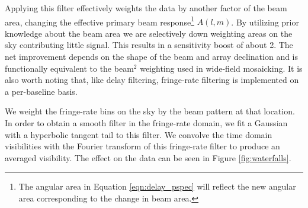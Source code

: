 \documentclass[twocolumn,numberedappendix]{emulateapj} \shorttitle{New Limits on the 21 cm Power Spectrum at $z=8.4$}
\begin{document}
Applying this filter effectively weights the data by another factor of the beam
area, changing the effective primary beam response\footnote{The
angular area in Equation \eqref{eqn:delay_pspec} will reflect the new angular area
corresponding to the change in beam area.} $A(l,m)$\citep{parsons_et_al2015}. By
utilizing prior knowledge about the beam area we are selectively down weighting
areas on the sky contributing little signal. This results in a sensitivity boost of
about 2.  The net improvement depends on the shape of the beam and array
declination and is functionally equivalent to the beam$^2$ weighting used in
wide-field mosaicking. It is also worth noting that, like delay 
filtering, fringe-rate filtering is implemented on a per-baseline basis.

 We weight
the fringe-rate bins on the sky by the beam pattern at that location.
In order to obtain a smooth filter in the fringe-rate domain, we fit a
Gaussian with a hyperbolic tangent tail to this filter. We convolve the time
domain visibilities with the Fourier transform of this fringe-rate filter to
produce an averaged visibility.  The effect on the data can be seen
in Figure \ref{fig:waterfalls}.

\end{document}
